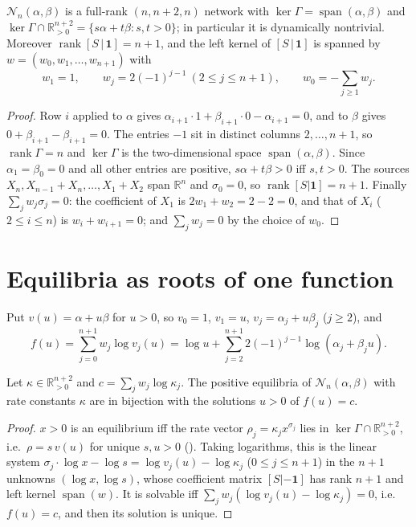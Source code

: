 \documentclass[11pt,a4paper]{report}
\newcommand{\Net}{\mathcal N}
\providecommand{\spn}{\operatorname{span}}
\begin{document}
\begin{lemma}\label{lem:structure}
\(\Net_n(\alpha,\beta)\) is a full-rank \((n,n+2,n)\) network with \(\ker\Gamma=\spn(\alpha,\beta)\) and
\(\ker\Gamma\cap\mathbb R^{n+2}_{>0}=\{s\alpha+t\beta:s,t>0\}\); in particular it is dynamically nontrivial. Moreover
\(\operatorname{rank}[S\,|\,\mathbf 1]=n+1\), and the left kernel of \([S\,|\,\mathbf 1]\) is spanned by
\(w=(w_0,w_1,\dots,w_{n+1})\) with
\[
w_1=1,\qquad w_j=2(-1)^{j-1}\ (2\le j\le n+1),\qquad w_0=-\textstyle\sum_{j\ge1}w_j .
\]
\end{lemma}

\begin{proof}
Row \(i\) applied to \(\alpha\) gives \(\alpha_{i+1}\cdot1+\beta_{i+1}\cdot0-\alpha_{i+1}=0\), and to \(\beta\) gives
\(0+\beta_{i+1}-\beta_{i+1}=0\). The entries \(-1\) sit in distinct columns \(2,\dots,n+1\), so \(\operatorname{rank}\Gamma=n\) and
\(\ker\Gamma\) is the two-dimensional space \(\spn(\alpha,\beta)\). Since \(\alpha_1=\beta_0=0\) and all other entries are
positive, \(s\alpha+t\beta>0\) iff \(s,t>0\). The sources \(X_n,X_{n-1}+X_n,\dots,X_1+X_2\) span \(\mathbb R^n\) and \(\sigma_0=0\),
so \(\operatorname{rank}[S|\mathbf1]=n+1\). Finally \(\sum_jw_j\sigma_j=0\): the coefficient of \(X_1\) is \(2w_1+w_2=2-2=0\), and
that of \(X_i\) (\(2\le i\le n\)) is \(w_i+w_{i+1}=0\); and \(\sum_jw_j=0\) by the choice of \(w_0\).
\end{proof}

\section{Equilibria as roots of one function}

Put \(v(u)=\alpha+u\beta\) for \(u>0\), so \(v_0=1\), \(v_1=u\), \(v_j=\alpha_j+u\beta_j\) (\(j\ge2\)), and
\[
f(u)=\sum_{j=0}^{n+1}w_j\log v_j(u)=\log u+\sum_{j=2}^{n+1}2(-1)^{j-1}\log(\alpha_j+\beta_ju).
\]

\begin{lemma}\label{lem:bijection}
Let \(\kappa\in\mathbb R^{n+2}_{>0}\) and \(c=\sum_jw_j\log\kappa_j\). The positive equilibria of \(\Net_n(\alpha,\beta)\) with rate
constants \(\kappa\) are in bijection with the solutions \(u>0\) of \(f(u)=c\).
\end{lemma}

\begin{proof}
\(x>0\) is an equilibrium iff the rate vector \(\rho_j=\kappa_jx^{\sigma_j}\) lies in \(\ker\Gamma\cap\mathbb R^{n+2}_{>0}\), i.e.\
\(\rho=s\,v(u)\) for unique \(s,u>0\) (). Taking logarithms, this is the linear system
\(\sigma_j\cdot\log x-\log s=\log v_j(u)-\log\kappa_j\) (\(0\le j\le n+1\)) in the \(n+1\) unknowns \((\log x,\log s)\), whose
coefficient matrix \([S|-\mathbf1]\) has rank \(n+1\) and left kernel \(\spn(w)\). It is solvable iff
\(\sum_jw_j(\log v_j(u)-\log\kappa_j)=0\), i.e.\ \(f(u)=c\), and then its solution is unique.
\end{proof}
\end{document}
